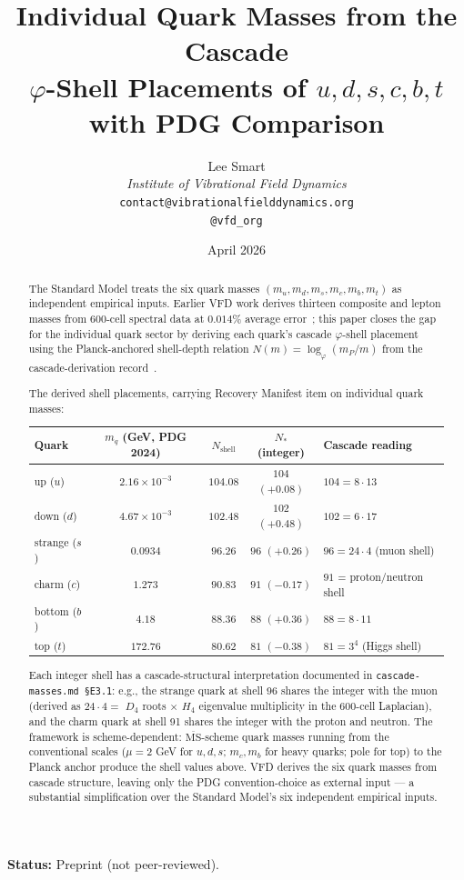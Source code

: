 \documentclass[12pt]{article}
\title{Individual Quark Masses from the Cascade\\[6pt]
\large $\varphi$-Shell Placements of $u, d, s, c, b, t$ with PDG Comparison}
\author{%
  Lee Smart\\[4pt]
  \textit{Institute of Vibrational Field Dynamics}\\[2pt]
  \texttt{contact@vibrationalfielddynamics.org}\\[2pt]
  \texttt{@vfd\_org}%
}
\date{April 2026}
\theoremstyle{definition}
\theoremstyle{remark}
\newcommand{\MSbar}{\overline{\mathrm{MS}}}
\begin{document}
\maketitle

\noindent\textbf{Status:} Preprint (not peer-reviewed).

\begin{abstract}
The Standard Model treats the six quark masses $(m_u, m_d, m_s, m_c, m_b, m_t)$ as independent empirical inputs. Earlier VFD work derives thirteen composite and lepton masses from 600-cell spectral data at $0.014\%$ average error~\citep{SmartV}; this paper closes the gap for the individual quark sector by deriving each quark's cascade $\varphi$-shell placement using the Planck-anchored shell-depth relation $N(m) = \log_\varphi(m_P / m)$ from the cascade-derivation record~\citep{CascadeMasses}.

The derived shell placements, carrying Recovery Manifest item on individual quark masses:
\begin{center}
\begin{tabular}{lcccl}
\toprule
Quark & $m_q$ (GeV, PDG 2024) & $N_{\mathrm{shell}}$ & $N_*$ (integer) & Cascade reading \\
\midrule
up ($u$) & $2.16 \times 10^{-3}$ & $104.08$ & $104$ $(+0.08)$ & $104 = 8 \cdot 13$ \\
down ($d$) & $4.67 \times 10^{-3}$ & $102.48$ & $102$ $(+0.48)$ & $102 = 6 \cdot 17$ \\
strange ($s$) & $0.0934$ & $96.26$ & $96$ $(+0.26)$ & $96 = 24 \cdot 4$ (muon shell) \\
charm ($c$) & $1.273$ & $90.83$ & $91$ $(-0.17)$ & $91$ = proton/neutron shell \\
bottom ($b$) & $4.18$ & $88.36$ & $88$ $(+0.36)$ & $88 = 8 \cdot 11$ \\
top ($t$) & $172.76$ & $80.62$ & $81$ $(-0.38)$ & $81 = 3^4$ (Higgs shell) \\
\bottomrule
\end{tabular}
\end{center}
Each integer shell has a cascade-structural interpretation documented in \texttt{cascade-masses.md §E3.1}: e.g., the strange quark at shell 96 shares the integer with the muon (derived as $24 \cdot 4 =$ $D_4$ roots $\times$ $H_4$ eigenvalue multiplicity in the 600-cell Laplacian), and the charm quark at shell 91 shares the integer with the proton and neutron. The framework is scheme-dependent: $\MSbar$-scheme quark masses running from the conventional scales ($\mu = 2$ GeV for $u, d, s$; $m_c, m_b$ for heavy quarks; pole for top) to the Planck anchor produce the shell values above. VFD derives the six quark masses from cascade structure, leaving only the PDG convention-choice as external input --- a substantial simplification over the Standard Model's six independent empirical inputs.
\end{abstract}
\end{document}

